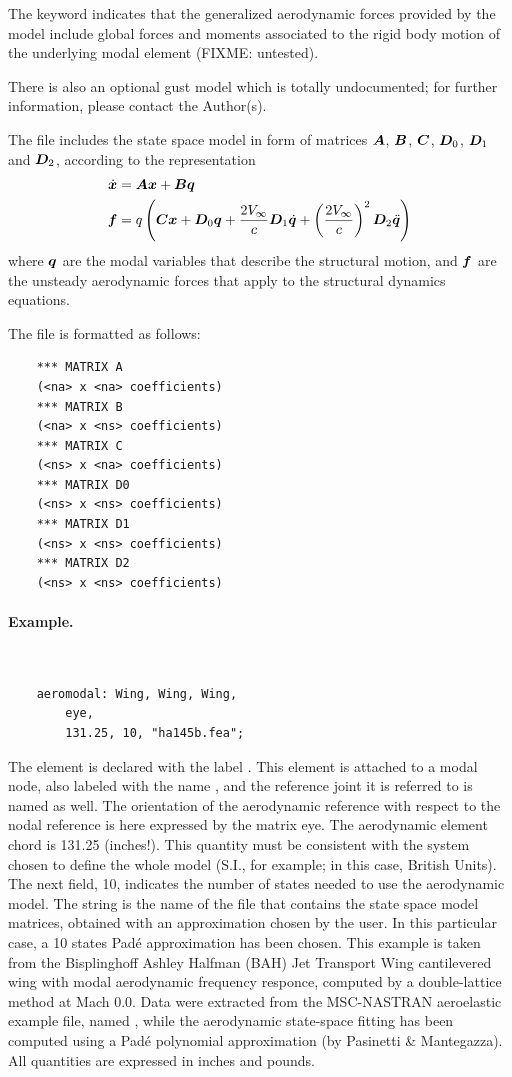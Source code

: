 The keyword  indicates that the generalized aerodynamic forces
provided by the model include global forces and moments associated 
to the rigid body motion of the underlying modal element (FIXME: untested).

There is also an optional gust model which is totally undocumented;
for further information, please contact the Author(s).

The  file includes the state space model in form 
of matrices $\boldsymbol{A}$, $\boldsymbol{B}$, $\boldsymbol{C}$, $\boldsymbol{D}_0$, $\boldsymbol{D}_1$ and $\boldsymbol{D}_2$,
according to the representation
\begin{align*}
	\dot{\boldsymbol{x}} &= \boldsymbol{A}\boldsymbol{x} + \boldsymbol{B}\boldsymbol{q} \\	
	\boldsymbol{f} &= q\left( \boldsymbol{C}\boldsymbol{x} + \boldsymbol{D}_0 \boldsymbol{q} + \frac{2V_{\infty}}{c} \boldsymbol{D}_1 \dot{\boldsymbol{q}} + \left( \frac{2V_{\infty}}{c} \right)^2 \boldsymbol{D}_2 \ddot{\boldsymbol{q}} \right)
\end{align*}
where $\boldsymbol{q}$ are the modal variables that describe the structural motion,
and $\boldsymbol{f}$ are the unsteady aerodynamic forces that apply to the structural
dynamics equations.

The file is formatted as follows:
\begin{verbatim}
    *** MATRIX A
    (<na> x <na> coefficients)
    *** MATRIX B
    (<na> x <ns> coefficients)
    *** MATRIX C
    (<ns> x <na> coefficients)
    *** MATRIX D0
    (<ns> x <ns> coefficients)
    *** MATRIX D1
    (<ns> x <ns> coefficients)
    *** MATRIX D2
    (<ns> x <ns> coefficients)
\end{verbatim}

\paragraph{Example.} \
\begin{verbatim}
    aeromodal: Wing, Wing, Wing,
        eye,
        131.25, 10, "ha145b.fea";
\end{verbatim}
The  element is declared with the label .
This element is attached to a modal node, also labeled
with the name , and the reference  joint 
it is referred to is named \kw{Wing} as well.
The orientation of the aerodynamic reference with respect 
to the nodal reference is here expressed by the matrix eye.
The aerodynamic element chord is 131.25 (inches!).
This quantity must be consistent with the system chosen to define 
the whole model (S.I., for example; in this case, British Units).
The next field, 10, indicates the number of states needed to use 
the aerodynamic model.
The string  is the name of the file that contains
the state space model matrices, obtained with an approximation 
chosen by the user.
In this particular case, a 10 states Pad\'e approximation 
has been chosen.
This example is taken from the Bisplinghoff Ashley Halfman
(BAH) Jet Transport Wing cantilevered wing with modal aerodynamic 
frequency responce, computed by a double-lattice method at Mach 0.0.
Data were extracted from the MSC-NASTRAN aeroelastic example file, 
named \kw{ha145b}, while the aerodynamic state-space fitting 
has been computed using a Pad\'e polynomial approximation
(by Pasinetti \& Mantegazza).
All quantities are expressed in inches and pounds.



